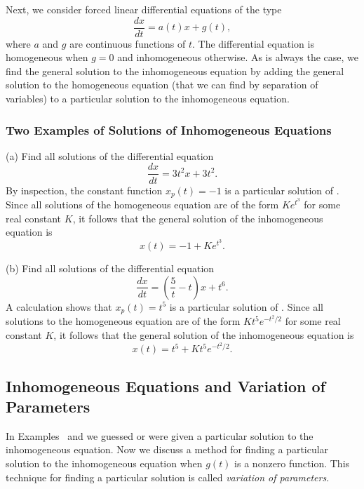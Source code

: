 \documentclass{ximera}
\begin{document}
Next, we consider forced linear differential equations of the type
\begin{equation}   \label{eq:linode1}
\frac{dx}{dt} = a(t)x + g(t),
\end{equation}
where $a$ and $g$ are continuous functions of $t$.  The differential  
equation  is homogeneous when $g=0$  and 
 inhomogeneous otherwise.  As is always the 
case, we find the general solution 
to the inhomogeneous equation 
by adding the general solution to the homogeneous equation (that
we can find by separation of variables) to a particular solution to 
the inhomogeneous equation.  

\subsubsection*{Two Examples of Solutions of Inhomogeneous Equations}

(a) Find all solutions of the differential equation
\begin{equation} \label{E:ie1}
\frac{dx}{dt} = 3t^2x + 3t^2.
\end{equation}
By inspection, the constant function $x_p(t)=-1$ is a 
particular solution 
of . 
Since all solutions of the homogeneous equation are of the form $Ke^{t^3}$
for some real constant $K$, it follows that the general solution of the 
inhomogeneous equation is
\[
x(t) = -1 + Ke^{t^3}.
\]

\noindent (b) Find all solutions of the differential equation
\begin{equation}  \label{E:ie2}
\frac{dx}{dt} = \left(\frac{5}{t}-t\right) x + t^6.
\end{equation}
A calculation shows that $x_p(t)=t^5$ is a particular solution of . 
Since all solutions to the homogeneous equation are of the form 
$Kt^5 e^{-t^2/2}$ for some real constant $K$, it follows that the general
solution of the inhomogeneous equation is
\[
x(t) = t^5 + Kt^5 e^{-t^2/2}.
\]

\subsection*{Inhomogeneous Equations and Variation of Parameters}

In Examples~ and  we guessed or were given a
particular solution 
to the inhomogeneous equation.  Now we discuss 
a method for finding a particular solution to the inhomogeneous
equation  when $g(t)$ is a nonzero function.   This 
technique for finding a particular solution is called 
{\em variation of parameters\/}.  
\end{document}

